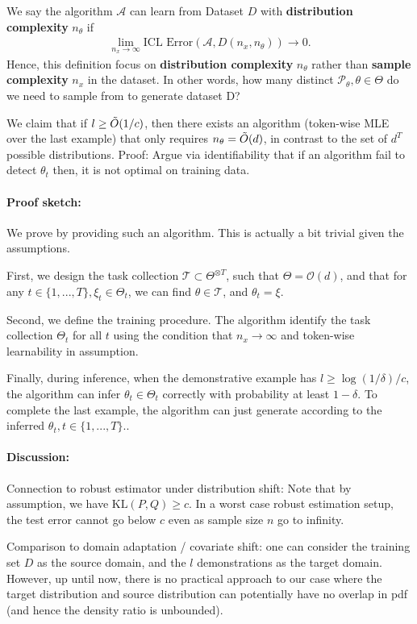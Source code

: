 We say the algorithm $\mathcal{A}$ can learn from Dataset $D$ with \textbf{distribution complexity} $n_\theta$ if 
\begin{align*}
    \lim_{n_x \to \infty}\text{ICL Error}(\mathcal{A}, D(n_x, n_\theta)) \to 0.
\end{align*}
Hence, this definition focus on \textbf{distribution complexity} $n_\theta$ rather than \textbf{sample complexity} $n_x$ in the dataset. In other words, how many distinct $\mathcal{P}_\theta, \theta \in \Theta$ do we need to sample from to generate dataset D?

We claim that if $l \ge \Tilde{O}(1/c)$, then there exists an algorithm (token-wise MLE over the last example) that only requires $n_{\theta} = \Tilde{O}(d)$, in  contrast to the set of $d^{T}$ possible distributions. Proof: Argue via identifiability that if an algorithm fail to detect $\theta_t$ then, it is not optimal on training data.


\paragraph{Proof sketch:} We prove by providing  such an algorithm. This is actually a bit trivial given the assumptions. 

First, we design the task collection $\mathcal{T} \subset \Theta^{\otimes T}$, such that $\hat{\Theta} = \mathcal{O}(d)$, and that for any $t \in \{1, ..., T\}, \xi_t \in \Theta_t$, we can find $\theta \in \mathcal{T}$, and $\theta_t = \xi$.

Second, we define the training procedure. The algorithm identify the task collection $\Theta_t$ for all $t$ using the condition that $n_x \to \infty$ and token-wise learnability  in assumption.

Finally, during inference, when the demonstrative example has $l \ge \log(1/\delta)/c$, the algorithm can infer $\theta_t \in \Theta_t$ correctly with probability at least $1-\delta$. To complete the last example, the algorithm can just generate according to the inferred $\theta_t, t \in \{1, ..., T\}$..




\paragraph{Discussion:} Connection to robust estimator under distribution shift: Note that by assumption, we have $\text{KL}(P,Q) \ge c$. In a worst case robust estimation setup, the test error cannot go below $c$ even as sample size $n$ go to infinity.

Comparison to domain adaptation / covariate shift: one can consider the training set $D$ as the source domain, and the $l$ demonstrations as the target domain. However, up until now, there is no practical approach to our case where the target distribution and source distribution can potentially have no overlap in pdf (and hence the density ratio is unbounded). 


